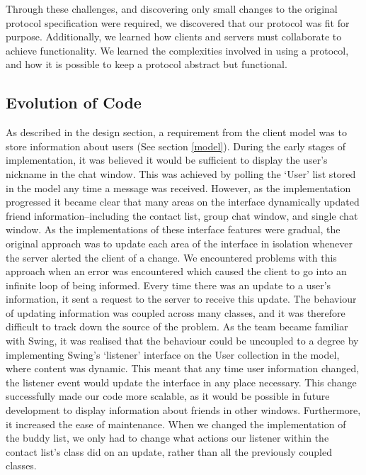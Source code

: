 Through these challenges, and discovering only small changes to the original protocol specification were required, we discovered that our protocol was fit for purpose. Additionally, we learned how clients and servers must collaborate to achieve functionality. We learned the complexities involved in using a protocol, and how it is possible to keep a protocol abstract but functional.

\subsection{Evolution of Code}
\label{code_evol}

As described in the design section, a requirement from the client model was to store information about users (See section \ref{model}). During the early stages of implementation, it was believed it would be sufficient to display the user's nickname in the chat window. This was achieved by polling the `User' list stored in the model any time a message was received. However, as the implementation progressed it became clear that many areas on the interface dynamically updated friend information--including the contact list, group chat window, and single chat window. As the implementations of these interface features were gradual, the original approach was to update each area of the interface in isolation whenever the server alerted the client of a change. We encountered problems with this approach when an error was encountered which caused the client to go into an infinite loop of being informed. Every time there was an update to a user's information, it sent a request to the server to receive this update. The behaviour of updating information was coupled across many classes, and it was therefore difficult to track down the source of the problem. As the team became familiar with Swing, it was realised that the behaviour could be uncoupled to a degree by implementing Swing's `listener' interface on the User collection in the model, where content was dynamic. This meant that any time user information changed, the listener event would update the interface in any place necessary. This change successfully made our code more scalable, as it would be possible in future development to display information about friends in other windows. Furthermore, it increased the ease of maintenance. When we changed the implementation of the buddy list, we only had to change what actions our listener within the contact list's class did on an update, rather than all the previously coupled classes. 

